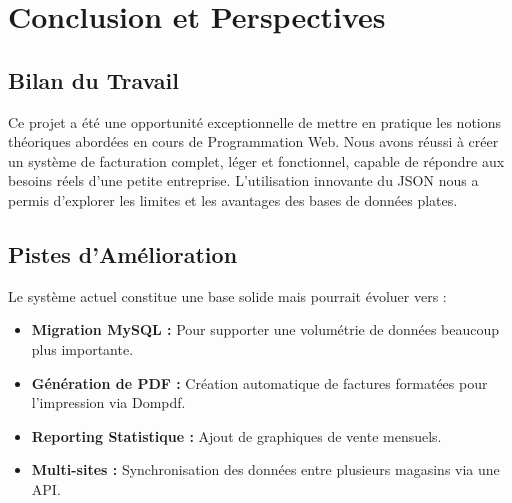 \documentclass[12pt,a4paper]{report}
\begin{document}
\chapter{Conclusion et Perspectives}
\section{Bilan du Travail}
Ce projet a été une opportunité exceptionnelle de mettre en pratique les notions théoriques abordées en cours de Programmation Web. Nous avons réussi à créer un système de facturation complet, léger et fonctionnel, capable de répondre aux besoins réels d'une petite entreprise. L'utilisation innovante du JSON nous a permis d'explorer les limites et les avantages des bases de données plates.

\section{Pistes d'Amélioration}
Le système actuel constitue une base solide mais pourrait évoluer vers :
\begin{itemize}
    \item \textbf{Migration MySQL :} Pour supporter une volumétrie de données beaucoup plus importante.
    \item \textbf{Génération de PDF :} Création automatique de factures formatées pour l'impression via Dompdf.
    \item \textbf{Reporting Statistique :} Ajout de graphiques de vente mensuels.
    \item \textbf{Multi-sites :} Synchronisation des données entre plusieurs magasins via une API.
\end{itemize}
\end{document}
